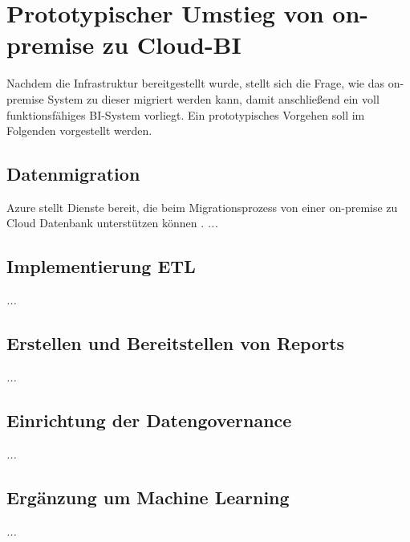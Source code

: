 \section{Prototypischer Umstieg von on-premise zu Cloud-BI} \label{sec:praktischeUmsetzung:Migration}
Nachdem die Infrastruktur bereitgestellt wurde, stellt sich die Frage, wie das on-premise System zu dieser migriert werden kann, damit anschließend ein voll funktionsfähiges BI-System vorliegt. Ein prototypisches Vorgehen soll im Folgenden vorgestellt werden.

\subsection{Datenmigration}
Azure stellt Dienste bereit, die beim Migrationsprozess von einer on-premise zu Cloud Datenbank unterstützen können \cite{chilberto_building_2020}. 
\textit{...}

\subsection{Implementierung ETL}
\textit{...}

\subsection{Erstellen und Bereitstellen von Reports}
\textit{...}

\subsection{Einrichtung der Datengovernance}
\textit{...}

\subsection{Ergänzung um Machine Learning}
\textit{...}